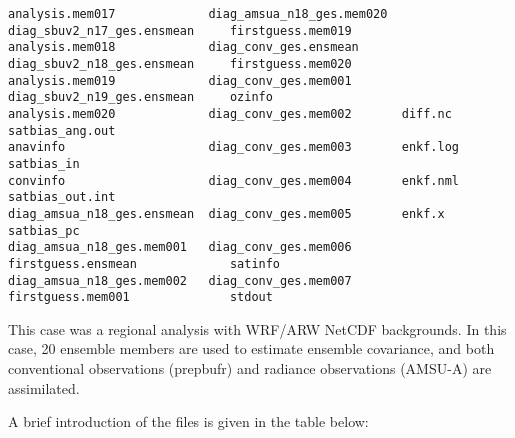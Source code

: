 \begin{scriptsize}
\begin{verbatim}
analysis.mem017             diag_amsua_n18_ges.mem020  diag_sbuv2_n17_ges.ensmean     firstguess.mem019
analysis.mem018             diag_conv_ges.ensmean      diag_sbuv2_n18_ges.ensmean     firstguess.mem020
analysis.mem019             diag_conv_ges.mem001       diag_sbuv2_n19_ges.ensmean     ozinfo
analysis.mem020             diag_conv_ges.mem002       diff.nc                        satbias_ang.out
anavinfo                    diag_conv_ges.mem003       enkf.log                       satbias_in
convinfo                    diag_conv_ges.mem004       enkf.nml                       satbias_out.int
diag_amsua_n18_ges.ensmean  diag_conv_ges.mem005       enkf.x                         satbias_pc
diag_amsua_n18_ges.mem001   diag_conv_ges.mem006       firstguess.ensmean             satinfo
diag_amsua_n18_ges.mem002   diag_conv_ges.mem007       firstguess.mem001              stdout
\end{verbatim}
\end{scriptsize}

This case was a regional analysis with WRF/ARW NetCDF backgrounds. In this case, 20 ensemble members are used to estimate ensemble covariance, and both conventional observations (prepbufr) and radiance observations (AMSU-A) are assimilated.

A brief introduction of the files is given in the table below:

